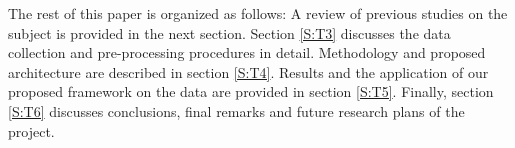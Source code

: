 The rest of this paper is organized as follows: A review of previous studies on the subject is provided in the next section. Section \ref{S:T3} discusses the data collection and pre-processing procedures in detail. Methodology and proposed architecture are described in section \ref{S:T4}. Results and the application of our proposed framework on the data are provided in section \ref{S:T5}. Finally, section \ref{S:T6} discusses conclusions, final remarks and future research plans of the project.
